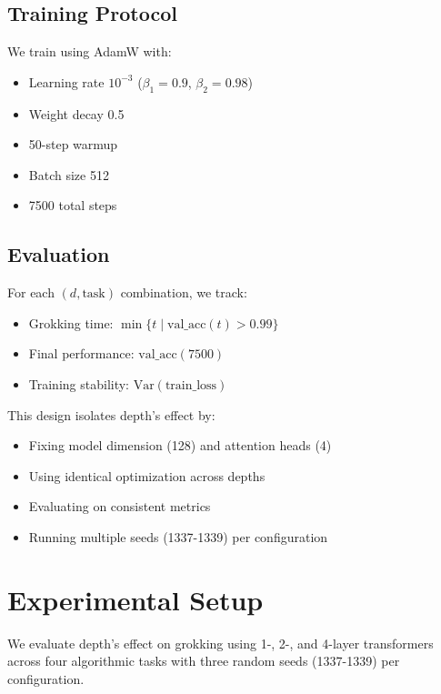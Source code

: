 \documentclass{article} %
\begin{document}
\subsection{Training Protocol}
We train using AdamW \citep{loshchilov2017adamw} with:
\begin{itemize}
    \item Learning rate $10^{-3}$ ($\beta_1=0.9$, $\beta_2=0.98$)
    \item Weight decay 0.5
    \item 50-step warmup
    \item Batch size 512
    \item 7500 total steps
\end{itemize}

\subsection{Evaluation}
For each $(d,\text{task})$ combination, we track:
\begin{itemize}
    \item Grokking time: $\min\{t \mid \text{val\_acc}(t) > 0.99\}$
    \item Final performance: $\text{val\_acc}(7500)$
    \item Training stability: $\text{Var}(\text{train\_loss})$
\end{itemize}

This design isolates depth's effect by:
\begin{itemize}
    \item Fixing model dimension (128) and attention heads (4)
    \item Using identical optimization across depths
    \item Evaluating on consistent metrics
    \item Running multiple seeds (1337-1339) per configuration
\end{itemize}

\section{Experimental Setup}
\label{sec:experimental}

We evaluate depth's effect on grokking using 1-, 2-, and 4-layer transformers across four algorithmic tasks with three random seeds (1337-1339) per configuration.
\end{document}
